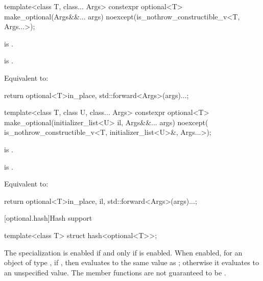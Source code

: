 %
\begin{itemdecl}
template<class T, class... Args>
  constexpr optional<T> make_optional(Args&&... args) noexcept(is_nothrow_constructible_v<T, Args...>);
\end{itemdecl}

\begin{itemdescr}
\pnum
\constraints
{} is .

\pnum
\mandates
{} is .

\pnum
\effects
Equivalent to:
\begin{codeblock}
return optional<T>{in_place, std::forward<Args>(args)...};
\end{codeblock}
\end{itemdescr}

%
\begin{itemdecl}
template<class T, class U, class... Args>
  constexpr optional<T> make_optional(initializer_list<U> il, Args&&... args) noexcept(
      is_nothrow_constructible_v<T, initializer_list<U>&, Args...>);
\end{itemdecl}

\begin{itemdescr}
\pnum
\constraints
{} is .

\pnum
\mandates
{} is .

\pnum
\effects
Equivalent to:
\begin{codeblock}
return optional<T>{in_place, il, std::forward<Args>(args)...};
\end{codeblock}
\end{itemdescr}

[optional.hash]{Hash support}

\begin{itemdecl}
template<class T> struct hash<optional<T>>;
\end{itemdecl}

\begin{itemdescr}
\pnum
The specialization  is enabled if and only if  is enabled. When enabled, for an object  of type , if , then  evaluates to the same value as ; otherwise it evaluates to an unspecified value. The member functions are not guaranteed to be .
\end{itemdescr}

